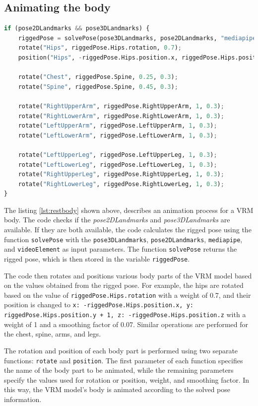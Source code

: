 \subsection{Animating the body}
\begin{lstlisting}[language=Python,caption=Animating the rest of the body,label=lst:restbody]
    if (pose2DLandmarks && pose3DLandmarks) {
    riggedPose = solvePose(pose3DLandmarks, pose2DLandmarks, "mediapipe", videoElement);
    rotate("Hips", riggedPose.Hips.rotation, 0.7);
    position("Hips", -riggedPose.Hips.position.x, riggedPose.Hips.position.y + 1, -riggedPose.Hips.position.z, 1, 0.07);

    rotate("Chest", riggedPose.Spine, 0.25, 0.3);
    rotate("Spine", riggedPose.Spine, 0.45, 0.3);

    rotate("RightUpperArm", riggedPose.RightUpperArm, 1, 0.3);
    rotate("RightLowerArm", riggedPose.RightLowerArm, 1, 0.3);
    rotate("LeftUpperArm", riggedPose.LeftUpperArm, 1, 0.3);
    rotate("LeftLowerArm", riggedPose.LeftLowerArm, 1, 0.3);

    rotate("LeftUpperLeg", riggedPose.LeftUpperLeg, 1, 0.3);
    rotate("LeftLowerLeg", riggedPose.LeftLowerLeg, 1, 0.3);
    rotate("RightUpperLeg", riggedPose.RightUpperLeg, 1, 0.3);
    rotate("RightLowerLeg", riggedPose.RightLowerLeg, 1, 0.3);
}

\end{lstlisting}
The listing \ref{lst:restbody} shown above, describes an animation process for a VRM body. 
The code checks if the \emph{pose2DLandmarks} and \emph{pose3DLandmarks} are available. If they are both available, 
the code calculates the rigged pose using the function \texttt{solvePose} with the \texttt{pose3DLandmarks}, \texttt{pose2DLandmarks}, 
\texttt{mediapipe}, and \texttt{videoElement} as input parameters. The function \texttt{solvePose} returns the rigged pose, which 
is then stored in the variable \texttt{riggedPose}.

The code then rotates and positions various body parts of the VRM model based on the values obtained from the 
rigged pose. For example, the hips are rotated based on the value of \texttt{riggedPose.Hips.rotation} with a weight 
of 0.7, and their position is changed to \texttt{x: -riggedPose.Hips.position.x, y: riggedPose.Hips.position.y + 1, z: 
-riggedPose.Hips.position.z} with a weight of 1 and a smoothing factor of 0.07. Similar operations are performed 
for the chest, spine, arms, and legs.

The rotation and position of each body part is performed using two separate functions: \texttt{rotate} and 
\texttt{position}. The first parameter of each function specifies the name of the body part to be animated, 
while the remaining parameters specify the values used for rotation or position, weight, and smoothing factor.
In this way, the VRM model's body is animated according to the solved pose information.

